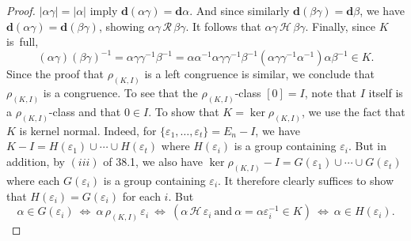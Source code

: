 \documentclass{surv-l}
\numberwithin{equation}{section}
\numberwithin{table}{section}
\numberwithin{figure}{section}
\theoremstyle{definition}
\begin{document}
\begin{proof}
$|\alpha\gamma|=|\alpha|$ imply
$\mathbf{d}(\alpha\gamma)=\mathbf{d}\alpha$. And since similarly
$\mathbf{d}(\beta\gamma)=\mathbf{d}\beta$, we have
$\mathbf{d}(\alpha\gamma)=\mathbf{d}(\beta\gamma)$, showing
$\alpha\gamma\,\mathcal{R}\,\beta\gamma$. It follows that
$\alpha\gamma\,\mathcal{H}\,\beta\gamma$. Finally, since $K$ is~full,
\[
(\alpha\gamma)(\beta\gamma)^{-1}=\alpha\gamma\gamma^{-1}\beta^{-1}
=\alpha\alpha^{-1}\alpha\gamma\gamma^{-1}\beta^{-1}
(\alpha\gamma\gamma^{-1}\alpha^{-1})\alpha\beta^{-1}\in K.
\]
Since the proof that $\rho_{(K,I)}$ is a left congruence is
similar, we conclude that $\rho_{(K,I)}$ is a congruence. To see
that the $\rho_{(K,I)}$-class $[0]=I$, note that $I$ itself is a
$\rho_{(K,I)}$-class and that $0\in I$. To show that
$K=\ker \rho_{(K,I)}$, we use the fact that $K$ is kernel
normal. Indeed, for $\{\varepsilon_{1},\ldots,
\varepsilon_{t}\}=E_{n}-I$, we have $K-I
=H(\varepsilon_{1})\cup\cdots\cup H(\varepsilon_{t})$ where
$H(\varepsilon_{i})$ is a group containing $\varepsilon_{i}$. But
in addition, by $(iii)$ of 38.1, we also have $\ker
\rho_{(K,I)}-I =G(\varepsilon_{1})\cup\cdots\cup
G(\varepsilon_{t})$ where each $G(\varepsilon_{i})$ is a group
containing $\varepsilon_{i}$. It therefore clearly suffices to
show that $H(\varepsilon_{i})=G(\varepsilon_{i})$ for each
$i$. But
\[
\alpha\in G(\varepsilon_{i})\ \Leftrightarrow\ \alpha\,\rho_{(K,I)}\,\varepsilon_{i}\ \Leftrightarrow\ (\alpha\,
\mathcal{H}\,\varepsilon_{i}\ \mathrm{and}\
\alpha=\alpha\varepsilon_{i}^{-1}\in K)\ \Leftrightarrow\ \alpha\in
H(\varepsilon_{i}).
\]


\end{proof}
\end{document}
